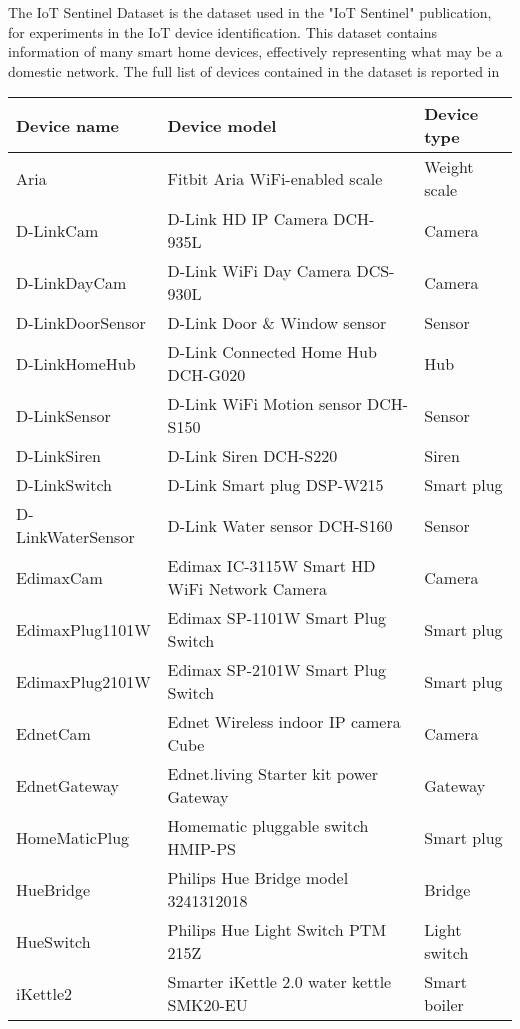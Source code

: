 The {IoT Sentinel Dataset}\cite{iot_site} is the dataset used in the "IoT Sentinel"\cite{iot_paper} publication, for experiments in the IoT device identification. This dataset contains information of many smart home devices, effectively representing what may be a domestic network. The full list of devices contained in the dataset is reported in 


\begin{table}[H]
    \centering
    \begin{tabular}{l|l|l}
    \toprule
     Device name & Device model & Device type  \\
    \midrule
  Aria              & Fitbit Aria WiFi-enabled scale  &  Weight scale \\
  D-LinkCam         & D-Link HD IP Camera DCH-935L    &  Camera \\
  D-LinkDayCam      & D-Link WiFi Day Camera DCS-930L &  Camera \\
  D-LinkDoorSensor  & D-Link Door \& Window sensor     &  Sensor\\
  D-LinkHomeHub     &  D-Link Connected Home Hub DCH-G020 &  Hub  \\
  D-LinkSensor      & D-Link WiFi Motion sensor DCH-S150 &  Sensor \\
  D-LinkSiren       & D-Link Siren DCH-S220&  Siren \\
  D-LinkSwitch      & D-Link Smart plug DSP-W215  &  Smart plug \\
  D-LinkWaterSensor & D-Link Water sensor DCH-S160 &  Sensor \\
  EdimaxCam         & Edimax IC-3115W Smart HD WiFi Network Camera &  Camera \\
  EdimaxPlug1101W   & Edimax SP-1101W Smart Plug Switch  &  Smart plug \\
  EdimaxPlug2101W   & Edimax SP-2101W Smart Plug Switch&  Smart plug \\
  EdnetCam          & Ednet Wireless indoor IP camera Cube  &  Camera\\
  EdnetGateway      & Ednet.living Starter kit power Gateway & Gateway \\
  HomeMaticPlug     & Homematic pluggable switch HMIP-PS & Smart plug \\
  HueBridge         & Philips Hue Bridge model 3241312018 &  Bridge\\
  HueSwitch         & Philips Hue Light Switch PTM 215Z &  Light switch \\
  iKettle2          &  Smarter iKettle 2.0 water kettle SMK20-EU & Smart boiler \\

\end{tabular}
\end{table}
